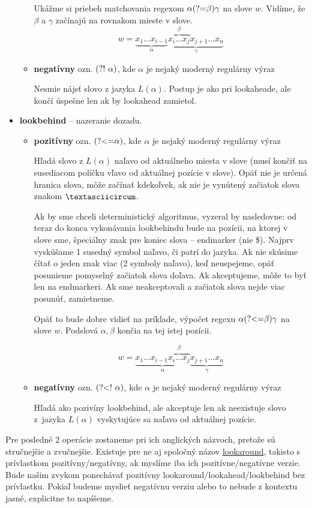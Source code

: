 \begin{itemize}
\begin{itemize}
Ukážme si priebeh matchovania regexom $\alpha\text{(?=}\beta)\gamma$ na slove $w$. Vidíme, že $\beta$ a $\gamma$ začínajú na rovnakom mieste v slove.
 $$w = \underbrace{x_1\dots x_{i-1}}_\alpha \underbrace{\overbrace{x_i \dots x_j}^\beta x_{j+1} \dots x_n }_\gamma$$ 
\item \textbf{negatívny} ozn. $\text{(?!~}\alpha)$, kde $\alpha$ je nejaký moderný regulárny výraz  

Nesmie nájsť slovo z jazyka $L(\alpha)$. Postup je ako pri lookaheade, ale končí úspešne len ak by lookahead zamietol.
\end{itemize}
\item \textbf{lookbehind} -- nazeranie dozadu.
\begin{itemize}
\item \textbf{pozitívny} ozn. $\text{(?\textless =}\alpha)$, kde $\alpha$ je nejaký moderný regulárny výraz 

Hľadá slovo z $L(\alpha)$ naľavo od aktuálneho miesta v slove (musí končiť na susediacom políčku vľavo od aktuálnej pozície v slove). Opäť nie je určená hranica slova, môže začínať kdekoľvek, ak nie je vynútený začiatok slova znakom $\textasciicircum$. 

Ak by sme chceli deterministický algoritmus, vyzeral by nasledovne: od teraz do konca vykonávania lookbehindu bude na pozícii, na ktorej v slove sme, špeciálny znak pre koniec slova -- endmarker (nie \$). Najprv vyskúšame 1 susedný symbol naľavo, či patrí do jazyka. Ak nie skúsime čítať o jeden znak viac (2 symboly naľavo), keď neuspejeme, opäť posunieme pomyselný začiatok slova doľava. Ak akceptujeme, môže to byť len na endmarkeri. Ak sme neakceptovali a začiatok slova nejde viac posunúť, zamietneme.

Opäť to bude dobre vidieť na príklade, výpočet regexu $\alpha\text{(?\textless =}\beta)\gamma$ na slove $w$. Podslová $\alpha,\beta$ končia na tej istej pozícii.

$$w = \underbrace{x_1\dots x_{i-1} \overbrace{x_i \dots x_j}^\beta}_\alpha \underbrace{x_{j+1} \dots x_n }_\gamma$$
\item \textbf{negatívny} ozn. $\text{(?\textless !~}\alpha)$, kde $\alpha$ je nejaký moderný regulárny výraz 

Hľadá ako pozivíny lookbehind, ale akceptuje len ak neexistuje slovo z~jazyka $L(\alpha)$ vyskytujúce sa naľavo od aktuálnej pozície.
\end{itemize}
\end{itemize}

Pre posledné 2 operácie zostaneme pri ich anglických názvoch, pretože sú stručnejšie a zvučnejšie. Existuje pre ne aj spoločný názov \underline{lookaround}, takisto s prívlastkom pozitívny/negatívny, ak myslíme iba ich pozitívne/negatívne verzie. Bude našim zvykom ponechávať pozitívny lookaround/lookahead/lookbehind bez prívlastku. Pokiaľ budeme myslieť negatívnu verziu alebo to nebude z kontextu jasné, explicitne to napíšeme.

